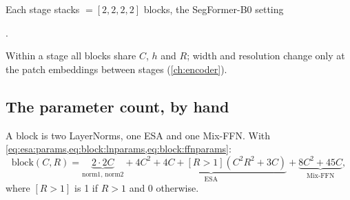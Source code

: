 
Each stage stacks  $= [2, 2, 2, 2]$ blocks, the SegFormer-B0 setting
\par\noindent{}.
\par\noindent Within a stage all blocks share $C$, $h$ and $R$; width and resolution change only at the
patch embeddings between stages (\cref{ch:encoder}).

\subsection{The parameter count, by hand}\label{sec:block:params}

A block is two LayerNorms, one ESA and one Mix-FFN. With
\cref{eq:esa:params,eq:block:lnparams,eq:block:ffnparams}:
\begin{equation}\label{eq:block:blockparams}
  \text{block}(C, R) = \underbrace{2\cdot2C}_{\text{norm1, norm2}} + \underbrace{4C^2 + 4C + [R > 1](C^2R^2 + 3C)}_{\text{ESA}} + \underbrace{8C^2 + 45C}_{\text{Mix-FFN}},
\end{equation}
where $[R > 1]$ is 1 if $R > 1$ and 0 otherwise.

